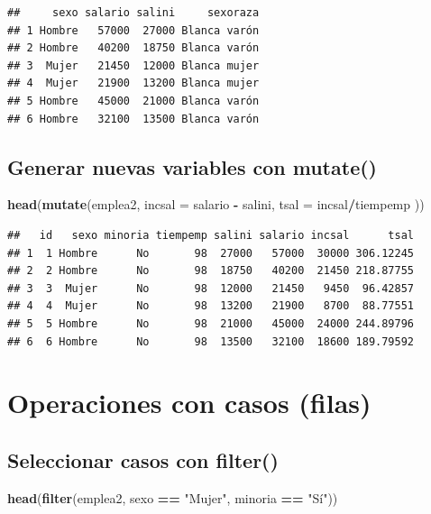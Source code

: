 \documentclass[]{book}
\newenvironment{Shaded}{\begin{snugshade}}{\end{snugshade}}
\newcommand{\KeywordTok}[1]{\textcolor[rgb]{0.13,0.29,0.53}{\textbf{#1}}}
\newcommand{\DataTypeTok}[1]{\textcolor[rgb]{0.13,0.29,0.53}{#1}}
\newcommand{\StringTok}[1]{\textcolor[rgb]{0.31,0.60,0.02}{#1}}
\newcommand{\OperatorTok}[1]{\textcolor[rgb]{0.81,0.36,0.00}{\textbf{#1}}}
\newcommand{\NormalTok}[1]{#1}
\begin{document}
\begin{verbatim}
##     sexo salario salini     sexoraza
## 1 Hombre   57000  27000 Blanca varón
## 2 Hombre   40200  18750 Blanca varón
## 3  Mujer   21450  12000 Blanca mujer
## 4  Mujer   21900  13200 Blanca mujer
## 5 Hombre   45000  21000 Blanca varón
## 6 Hombre   32100  13500 Blanca varón
\end{verbatim}

\subsection{\texorpdfstring{Generar nuevas variables con
\textbf{mutate()}}{Generar nuevas variables con mutate()}}\label{generar-nuevas-variables-con-mutate}

\begin{Shaded}
\begin{Highlighting}[]
\KeywordTok{head}\NormalTok{(}\KeywordTok{mutate}\NormalTok{(emplea2, }\DataTypeTok{incsal =}\NormalTok{ salario }\OperatorTok{-}\StringTok{ }\NormalTok{salini, }\DataTypeTok{tsal =}\NormalTok{ incsal}\OperatorTok{/}\NormalTok{tiempemp ))}
\end{Highlighting}
\end{Shaded}

\begin{verbatim}
##   id   sexo minoria tiempemp salini salario incsal      tsal
## 1  1 Hombre      No       98  27000   57000  30000 306.12245
## 2  2 Hombre      No       98  18750   40200  21450 218.87755
## 3  3  Mujer      No       98  12000   21450   9450  96.42857
## 4  4  Mujer      No       98  13200   21900   8700  88.77551
## 5  5 Hombre      No       98  21000   45000  24000 244.89796
## 6  6 Hombre      No       98  13500   32100  18600 189.79592
\end{verbatim}

\section{Operaciones con casos
(filas)}\label{operaciones-con-casos-filas}

\subsection{\texorpdfstring{Seleccionar casos con
\textbf{filter()}}{Seleccionar casos con filter()}}\label{seleccionar-casos-con-filter}

\begin{Shaded}
\begin{Highlighting}[]
\KeywordTok{head}\NormalTok{(}\KeywordTok{filter}\NormalTok{(emplea2, sexo }\OperatorTok{==}\StringTok{ "Mujer"}\NormalTok{, minoria }\OperatorTok{==}\StringTok{ "Sí"}\NormalTok{))}
\end{Highlighting}
\end{Shaded}
\end{document}
